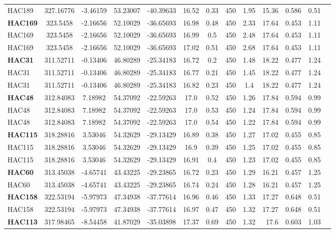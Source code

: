 \documentclass[a4paper,12pt]{article}
\begin{document}
\begin{longtable}{@{\extracolsep{\fill}}lccclccccrlll@{}}
HAC189 & 327.16776 & -3.46159 & 53.23007 & -40.39633 & 16.52 & 0.33 & 450 & 1.95 & 15.36 & 0.586 & 0.51 \\
\textbf{HAC169} & 323.5458 & -2.16656 & 52.10029 & -36.65693 & 16.98 & 0.48 & 450 & 2.33 & 17.64 & 0.453 & 1.11 \\
HAC169 & 323.5458 & -2.16656 & 52.10029 & -36.65693 & 16.99 & 0.5 & 450 & 2.48 & 17.64 & 0.453 & 1.11 \\
HAC169 & 323.5458 & -2.16656 & 52.10029 & -36.65693 & 17.02 & 0.51 & 450 & 2.68 & 17.64 & 0.453 & 1.11 \\
\textbf{HAC31} & 311.52711 & -0.13406 & 46.80289 & -25.34183 & 16.72 & 0.2 & 450 & 1.48 & 18.22 & 0.477 & 1.24 \\
HAC31 & 311.52711 & -0.13406 & 46.80289 & -25.34183 & 16.77 & 0.21 & 450 & 1.45 & 18.22 & 0.477 & 1.24 \\
HAC31 & 311.52711 & -0.13406 & 46.80289 & -25.34183 & 16.82 & 0.23 & 450 & 1.4 & 18.22 & 0.477 & 1.24 \\
\textbf{HAC48} & 312.84083 & 7.18982 & 54.37092 & -22.59263 & 17.0 & 0.52 & 450 & 1.26 & 17.84 & 0.594 & 0.99 \\
HAC48 & 312.84083 & 7.18982 & 54.37092 & -22.59263 & 17.0 & 0.53 & 450 & 1.24 & 17.84 & 0.594 & 0.99 \\
HAC48 & 312.84083 & 7.18982 & 54.37092 & -22.59263 & 17.0 & 0.54 & 450 & 1.22 & 17.84 & 0.594 & 0.99 \\
\textbf{HAC115} & 318.28816 & 3.53046 & 54.32629 & -29.13429 & 16.89 & 0.38 & 450 & 1.27 & 17.02 & 0.455 & 0.85 \\
HAC115 & 318.28816 & 3.53046 & 54.32629 & -29.13429 & 16.9 & 0.39 & 450 & 1.25 & 17.02 & 0.455 & 0.85 \\
HAC115 & 318.28816 & 3.53046 & 54.32629 & -29.13429 & 16.91 & 0.4 & 450 & 1.23 & 17.02 & 0.455 & 0.85 \\
\textbf{HAC60} & 313.45038 & -4.65741 & 43.43225 & -29.23865 & 16.72 & 0.23 & 450 & 1.29 & 16.21 & 0.457 & 1.25 \\
HAC60 & 313.45038 & -4.65741 & 43.43225 & -29.23865 & 16.74 & 0.24 & 450 & 1.28 & 16.21 & 0.457 & 1.25 \\
\textbf{HAC158} & 322.53194 & -5.97973 & 47.34938 & -37.77614 & 16.96 & 0.46 & 450 & 1.33 & 17.27 & 0.648 & 0.51 \\
HAC158 & 322.53194 & -5.97973 & 47.34938 & -37.77614 & 16.97 & 0.47 & 450 & 1.32 & 17.27 & 0.648 & 0.51 \\
\textbf{HAC113} & 317.98465 & -8.54458 & 41.87029 & -35.03898 & 17.37 & 0.69 & 450 & 1.32 & 17.6 & 0.603 & 1.03 \\

\end{longtable}
\end{document}
